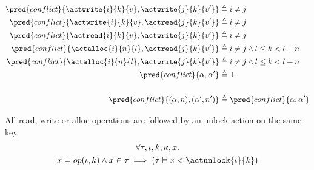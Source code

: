 \begin{align*}
	\pred{conflict}{\actwrite{i}{k}{v}, \actwrite{j}{k}{v'}} &\triangleq i \neq j
\\
	\pred{conflict}{\actwrite{i}{k}{v}, \actread{j}{k}{v'}} &\triangleq i \neq j
\\
	\pred{conflict}{\actread{i}{k}{v}, \actwrite{j}{k}{v'}} &\triangleq i \neq j
\\
	\pred{conflict}{\actalloc{i}{n}{l}, \actread{j}{k}{v'}} &\triangleq i \neq j \land l \leq k < l + n
\\
	\pred{conflict}{\actalloc{i}{n}{l}, \actwrite{j}{k}{v'}} &\triangleq i \neq j \land l \leq k < l + n
\\
	\pred{conflict}{\alpha, \alpha'} &\triangleq \bot
\\ \\
	\pred{conflict}{(\alpha, n), (\alpha', n')} &\triangleq \pred{conflict}{\alpha, \alpha'}
\end{align*}

\lem \label{lem:unlock} All read, write or alloc operations are followed by an unlock action on the same key.
\begin{gather*}
	\forall \tau, \iota, k, \kappa, x \ldotp \\
	x = op(\iota, k) \land x \in \tau \implies \left( \tau \vDash x < \actunlock{\iota}{k} \right)
\end{gather*}

